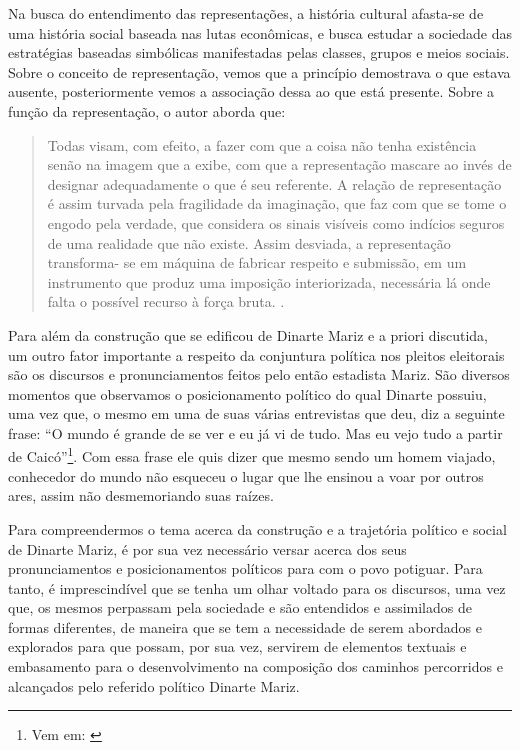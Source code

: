 \begin{refsection}
    Na busca do entendimento das representações, a história cultural afasta-se de uma história social baseada nas lutas econômicas, e busca estudar a sociedade das estratégias baseadas simbólicas manifestadas pelas classes, grupos e meios sociais. Sobre o conceito de representação, vemos que a princípio demostrava o que estava ausente, posteriormente vemos a associação dessa ao que está presente. Sobre a função da representação, o autor aborda que:

    \begin{quotation}
        Todas visam, com efeito, a fazer com que a coisa não tenha existência senão na imagem que a exibe, com que a representação mascare ao invés de designar adequadamente o que é seu referente. A relação de representação é assim turvada pela fragilidade da imaginação, que faz com que se tome o engodo pela verdade, que considera os sinais visíveis como indícios seguros de uma realidade que não existe. Assim desviada, a representação transforma- se em máquina de fabricar respeito e submissão, em um instrumento que produz uma imposição interiorizada, necessária lá onde falta o possível recurso à força bruta. \cite[p.~75]{Chartier1990Historia}.
    \end{quotation}

    Para além da construção que se edificou de Dinarte Mariz e a priori discutida, um outro fator importante a respeito da conjuntura política nos pleitos eleitorais são os discursos e pronunciamentos feitos pelo então estadista Mariz. São diversos momentos que observamos o posicionamento político do qual Dinarte possuiu, uma vez que, o mesmo em uma de suas várias entrevistas que deu, diz a seguinte frase: ``O mundo é grande de se ver e eu já vi de tudo. Mas eu vejo tudo a partir de Caicó''\footnote{Vem em: \textcite[p.~70]{Lima2003Solidao}}. Com essa frase ele quis dizer que mesmo sendo um homem viajado, conhecedor do mundo não esqueceu o lugar que lhe ensinou a voar por outros ares, assim não desmemoriando suas raízes. 

    Para compreendermos o tema acerca da construção e a trajetória político e social de Dinarte Mariz, é por sua vez necessário versar acerca dos seus pronunciamentos e posicionamentos políticos para com o povo potiguar. Para tanto, é imprescindível que se tenha um olhar voltado para os discursos, uma vez que, os mesmos perpassam pela sociedade e são entendidos e assimilados de formas diferentes, de maneira que se tem a necessidade de serem abordados e explorados para que possam, por sua vez, servirem de elementos textuais e embasamento para o desenvolvimento na composição dos caminhos percorridos e alcançados pelo referido político Dinarte Mariz. 


\end{refsection}
